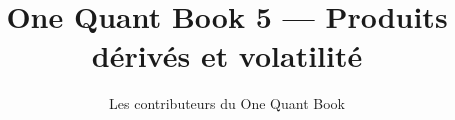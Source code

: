 \documentclass[11pt,a4paper,twoside,openany]{book}
\title{One Quant Book 5 --- Produits dérivés et volatilité}
\author{Les contributeurs du One Quant Book}
\date{\bookdate}
\begin{document}
\frontmatter



\tableofcontents

\mainmatter


\appendix
\part{\omsolutionspart}


\backmatter
\printindex
\end{document}
